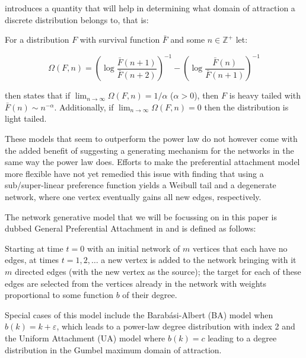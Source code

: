 \documentclass[
  sn-basic,
]{sn-jnl}
\theoremstyle{plain}
\theoremstyle{remark}
\begin{document}
\citet{shimura12} introduces a quantity that will help in determining
what domain of attraction a discrete distribution belongs to, that is:

For a distribution \(F\) with survival function \(\bar F\) and some
\(n\in\mathbb Z^+\) let:

\[
\Omega(F,n) = \left(\log\displaystyle\frac{\bar F (n+1)}{\bar F (n+2)}\right)^{-1} - \left(\log\displaystyle\frac{\bar F (n)}{\bar F (n+1)}\right)^{-1}
\]

\citet{shimura12} then states that if
\(\lim_{n\rightarrow\infty} \Omega(F,n) = 1/\alpha\) (\(\alpha>0\)),
then \(F\) is heavy tailed with \(\bar F(n) \sim n^{-\alpha}\).
Additionally, if \(\lim_{n\rightarrow\infty} \Omega(F,n) = 0\) then the
distribution is light tailed.

\citep[CL: The results of][ could be moved closer to Proposition 2.1. In
the introduction, if you want to include \citet{shimura12}, you can
mention the paper in passing, when outlining your approach, e.g.~``Using
the results by \citet{shimura12}, we derive the tail index / heaviness
of the limiting degree distribution of the GPA model \citep{rudas07}.
This informs us the precise class of preference functions that result in
flexible heavy tail.'']{shimura12}

These models that seem to outperform the power law do not however come
with the added benefit of suggesting a generating mechanism for the
networks in the same way the power law does. Efforts to make the
preferential attachment model more flexible have not yet remedied this
issue with \citet{krapivsky01} finding that using a sub/super-linear
preference function yields a Weibull tail and a degenerate network,
where one vertex eventually gains all new edges, respectively.

The network generative model that we will be focussing on in this paper
is dubbed General Preferential Attachment in \citet{rudas07} and is
defined as follows:

Starting at time \(t=0\) with an initial network of \(m\) vertices that
each have no edges, at times \(t=1,2,\ldots\) a new vertex is added to
the network bringing with it \(m\) directed edges (with the new vertex
as the source); the target for each of these edges are selected from the
vertices already in the network with weights proportional to some
function \(b\) of their degree.

Special cases of this model include the Barabási-Albert (BA) model when
\(b(k) = k+\varepsilon\), which leads to a power-law degree distribution
with index 2 and the Uniform Attachment (UA) model where \(b(k)=c\)
leading to a degree distribution in the Gumbel maximum domain of
attraction.
\end{document}
